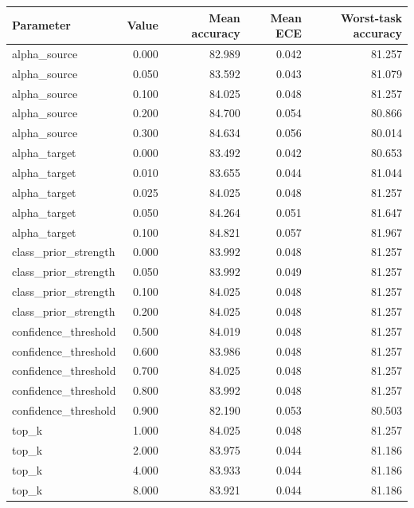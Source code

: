 \begin{tabular}{lrrrr}
\toprule
Parameter & Value & Mean accuracy & Mean ECE & Worst-task accuracy \\
\midrule
alpha\_source & 0.000 & 82.989 & 0.042 & 81.257 \\
alpha\_source & 0.050 & 83.592 & 0.043 & 81.079 \\
alpha\_source & 0.100 & 84.025 & 0.048 & 81.257 \\
alpha\_source & 0.200 & 84.700 & 0.054 & 80.866 \\
alpha\_source & 0.300 & 84.634 & 0.056 & 80.014 \\
alpha\_target & 0.000 & 83.492 & 0.042 & 80.653 \\
alpha\_target & 0.010 & 83.655 & 0.044 & 81.044 \\
alpha\_target & 0.025 & 84.025 & 0.048 & 81.257 \\
alpha\_target & 0.050 & 84.264 & 0.051 & 81.647 \\
alpha\_target & 0.100 & 84.821 & 0.057 & 81.967 \\
class\_prior\_strength & 0.000 & 83.992 & 0.048 & 81.257 \\
class\_prior\_strength & 0.050 & 83.992 & 0.049 & 81.257 \\
class\_prior\_strength & 0.100 & 84.025 & 0.048 & 81.257 \\
class\_prior\_strength & 0.200 & 84.025 & 0.048 & 81.257 \\
confidence\_threshold & 0.500 & 84.019 & 0.048 & 81.257 \\
confidence\_threshold & 0.600 & 83.986 & 0.048 & 81.257 \\
confidence\_threshold & 0.700 & 84.025 & 0.048 & 81.257 \\
confidence\_threshold & 0.800 & 83.992 & 0.048 & 81.257 \\
confidence\_threshold & 0.900 & 82.190 & 0.053 & 80.503 \\
top\_k & 1.000 & 84.025 & 0.048 & 81.257 \\
top\_k & 2.000 & 83.975 & 0.044 & 81.186 \\
top\_k & 4.000 & 83.933 & 0.044 & 81.186 \\
top\_k & 8.000 & 83.921 & 0.044 & 81.186 \\
\bottomrule
\end{tabular}
